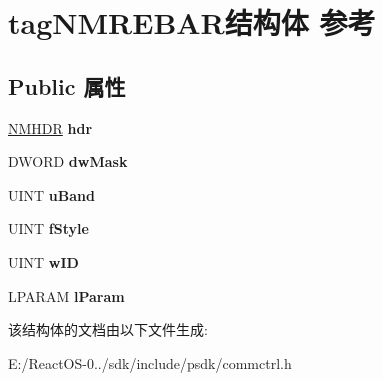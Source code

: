\hypertarget{structtag_n_m_r_e_b_a_r}{}\section{tag\+N\+M\+R\+E\+B\+A\+R结构体 参考}
\label{structtag_n_m_r_e_b_a_r}
\subsection*{Public 属性}
\begin{DoxyCompactItemize}
\item 
\mbox{\label{structtag_n_m_r_e_b_a_r_ad9fdb0769e8eba86beb7179bfe02873e}} 
\hyperlink{structtag_n_m_h_d_r}{N\+M\+H\+DR} {\bfseries hdr}
\item 
\mbox{\label{structtag_n_m_r_e_b_a_r_a153d1f83e358ef9996a3b99fbcfcdfdc}} 
D\+W\+O\+RD {\bfseries dw\+Mask}
\item 
\mbox{\label{structtag_n_m_r_e_b_a_r_af5bd4c87ed7f7a190a58d83756ae631c}} 
U\+I\+NT {\bfseries u\+Band}
\item 
\mbox{\label{structtag_n_m_r_e_b_a_r_a3f502bc9fc8b9067f4f88e064a4ceaf5}} 
U\+I\+NT {\bfseries f\+Style}
\item 
\mbox{\label{structtag_n_m_r_e_b_a_r_a7c2c36318213c23becd05ea02e4a916b}} 
U\+I\+NT {\bfseries w\+ID}
\item 
\mbox{\label{structtag_n_m_r_e_b_a_r_aa4f8a73f40012f5572348747e68a3966}} 
L\+P\+A\+R\+AM {\bfseries l\+Param}
\end{DoxyCompactItemize}


该结构体的文档由以下文件生成\+:\begin{DoxyCompactItemize}
\item 
E\+:/\+React\+O\+S-\/0../sdk/include/psdk/commctrl.\+h\end{DoxyCompactItemize}
